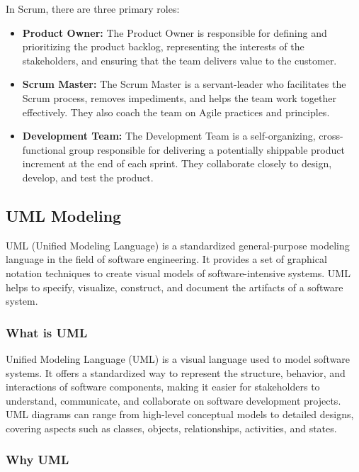 In Scrum, there are three primary roles:

\begin{itemize}[label=]
      \item \textbf{Product Owner:} The Product Owner is responsible for
            defining and prioritizing the product backlog, representing the
            interests of
            the stakeholders, and ensuring that the team delivers value to
            the customer.
      \item \textbf{Scrum Master:} The Scrum Master is a servant-leader who
            facilitates the Scrum process, removes impediments, and helps the
            team work
            together effectively. They also coach the team on Agile practices
            and
            principles.
      \item \textbf{Development Team:} The Development Team is a
            self-organizing, cross-functional group responsible for
            delivering a
            potentially shippable product increment at the end of each
            sprint. They
            collaborate closely to design, develop, and test the product.
\end{itemize}

\subsection{UML Modeling}

UML (Unified Modeling Language) is a standardized general-purpose modeling
language in the field of software engineering. It provides a set of graphical
notation techniques to create visual models of software-intensive systems. UML
helps to specify, visualize, construct, and document the artifacts of a
software system.

\subsubsection{What is UML}

Unified Modeling Language (UML) is a visual language used to model software
systems. It offers a standardized way to represent the structure, behavior, and
interactions of software components, making it easier for stakeholders to
understand, communicate, and collaborate on software development projects. UML
diagrams can range from high-level conceptual models to detailed designs,
covering aspects such as classes, objects, relationships, activities, and
states.

\subsubsection{Why UML}

